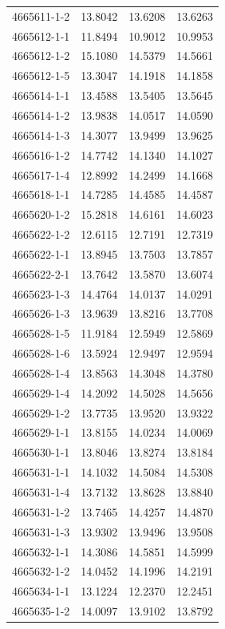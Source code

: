 \begin{longtable}{lrrr}
4665611-1-2 & 13.8042 & 13.6208 & 13.6263 \\
4665612-1-1 & 11.8494 & 10.9012 & 10.9953 \\
4665612-1-2 & 15.1080 & 14.5379 & 14.5661 \\
4665612-1-5 & 13.3047 & 14.1918 & 14.1858 \\
4665614-1-1 & 13.4588 & 13.5405 & 13.5645 \\
4665614-1-2 & 13.9838 & 14.0517 & 14.0590 \\
4665614-1-3 & 14.3077 & 13.9499 & 13.9625 \\
4665616-1-2 & 14.7742 & 14.1340 & 14.1027 \\
4665617-1-4 & 12.8992 & 14.2499 & 14.1668 \\
4665618-1-1 & 14.7285 & 14.4585 & 14.4587 \\
4665620-1-2 & 15.2818 & 14.6161 & 14.6023 \\
4665622-1-2 & 12.6115 & 12.7191 & 12.7319 \\
4665622-1-1 & 13.8945 & 13.7503 & 13.7857 \\
4665622-2-1 & 13.7642 & 13.5870 & 13.6074 \\
4665623-1-3 & 14.4764 & 14.0137 & 14.0291 \\
4665626-1-3 & 13.9639 & 13.8216 & 13.7708 \\
4665628-1-5 & 11.9184 & 12.5949 & 12.5869 \\
4665628-1-6 & 13.5924 & 12.9497 & 12.9594 \\
4665628-1-4 & 13.8563 & 14.3048 & 14.3780 \\
4665629-1-4 & 14.2092 & 14.5028 & 14.5656 \\
4665629-1-2 & 13.7735 & 13.9520 & 13.9322 \\
4665629-1-1 & 13.8155 & 14.0234 & 14.0069 \\
4665630-1-1 & 13.8046 & 13.8274 & 13.8184 \\
4665631-1-1 & 14.1032 & 14.5084 & 14.5308 \\
4665631-1-4 & 13.7132 & 13.8628 & 13.8840 \\
4665631-1-2 & 13.7465 & 14.4257 & 14.4870 \\
4665631-1-3 & 13.9302 & 13.9496 & 13.9508 \\
4665632-1-1 & 14.3086 & 14.5851 & 14.5999 \\
4665632-1-2 & 14.0452 & 14.1996 & 14.2191 \\
4665634-1-1 & 13.1224 & 12.2370 & 12.2451 \\
4665635-1-2 & 14.0097 & 13.9102 & 13.8792 \\

\end{longtable}
